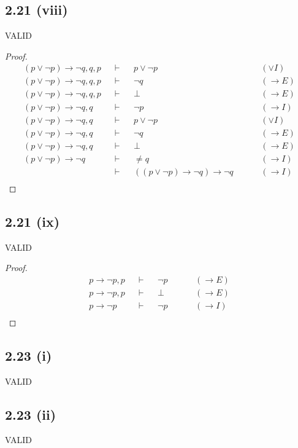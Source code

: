 \documentclass[12pt]{article}
\begin{document}
\subsection*{2.21 (viii)} VALID
\begin{proof}
\begin{align*}
    (p \vee \neg p) \rightarrow \neg q, q, p &&\vdash&& p \vee \neg p && &&(\vee I)\\
    (p \vee \neg p) \rightarrow \neg q, q, p &&\vdash&& \neg q && &&(\rightarrow E) \\
    (p \vee \neg p) \rightarrow \neg q, q, p &&\vdash&& \bot && &&(\rightarrow E) \\
    (p \vee \neg p) \rightarrow \neg q, q &&\vdash&& \neg p && &&(\rightarrow I) \\
    (p \vee \neg p) \rightarrow \neg q, q &&\vdash&& p \vee \neg p && &&(\vee I) \\
    (p \vee \neg p) \rightarrow \neg q, q &&\vdash&& \neg q && &&(\rightarrow E) \\
    (p \vee \neg p) \rightarrow \neg q, q &&\vdash&& \bot && &&(\rightarrow E) \\
    (p \vee \neg p) \rightarrow \neg q &&\vdash&& \neq q && &&(\rightarrow I) \\
    &&\vdash&& ((p \vee \neg p) \rightarrow \neg q) \rightarrow \neg q && &&(\rightarrow I) \\
\end{align*}
\end{proof}

\subsection*{2.21 (ix)} VALID
\begin{proof}
\begin{align*}
    p \rightarrow \neg p, p &&\vdash&& \neg p && &&(\rightarrow E) \\
    p \rightarrow \neg p, p &&\vdash&& \bot && &&(\rightarrow E) \\
    p \rightarrow \neg p &&\vdash&& \neg p && &&(\rightarrow I) \\
\end{align*}
\end{proof}


\subsection*{2.23 (i)} VALID
\subsection*{2.23 (ii)} VALID
\end{document}
